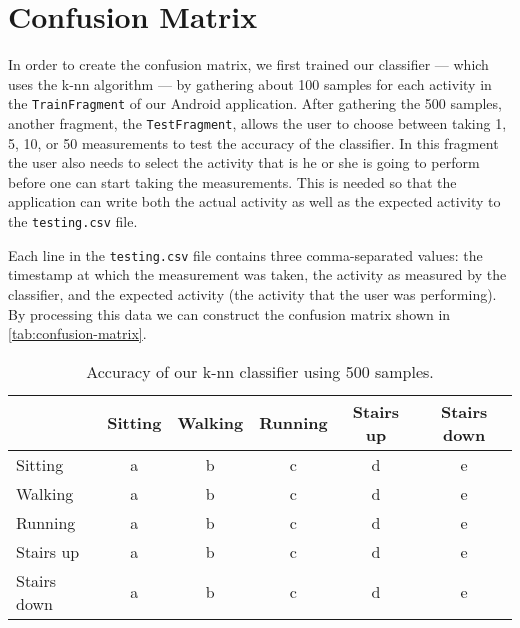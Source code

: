 \section{Confusion Matrix}
\label{sec:confusion-matrix}
In order to create the confusion matrix, we first trained our classifier --- which uses the k-nn algorithm --- by gathering about 100 samples for each activity in the \texttt{TrainFragment} of our Android application. After gathering the 500 samples, another fragment, the \texttt{TestFragment}, allows the user to choose between taking 1, 5, 10, or 50 measurements to test the accuracy of the classifier. In this fragment the user also needs to select the activity that is he or she is going to perform before one can start taking the measurements. This is needed so that the application can write both the actual activity as well as the expected activity to the \texttt{testing.csv} file.

Each line in the \texttt{testing.csv} file contains three comma-separated values: the timestamp at which the measurement was taken, the activity as measured by the classifier, and the expected activity (the activity that the user was performing). By processing this data we can construct the confusion matrix shown in \autoref{tab:confusion-matrix}.

\begin{table}[h]
\centering
\caption{Accuracy of our k-nn classifier using 500 samples.}
\begin{tabular}{lccccc}
\toprule
 & Sitting & Walking & Running & Stairs up & Stairs down\\
\midrule
Sitting & a & b & c & d & e\\
Walking & a & b & c & d & e\\
Running & a & b & c & d & e\\
Stairs up & a & b & c & d & e\\
Stairs down & a & b & c & d & e\\
\bottomrule
\end{tabular}
\label{tab:confusion-matrix}
\end{table}

